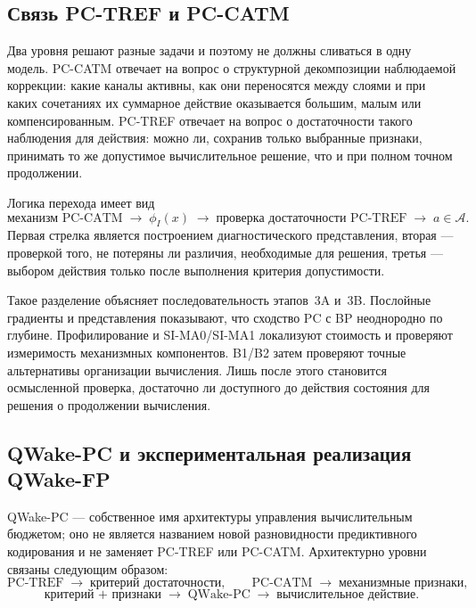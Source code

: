 \subsection{Связь PC-TREF и PC-CATM}
\label{sec:theory-tref-catm-link}

Два уровня решают разные задачи и поэтому не должны сливаться в одну модель.
PC-CATM отвечает на вопрос о структурной декомпозиции наблюдаемой коррекции:
какие каналы активны, как они переносятся между слоями и при каких сочетаниях их суммарное
действие оказывается большим, малым или компенсированным. PC-TREF отвечает на
вопрос о достаточности такого наблюдения для действия: можно ли, сохранив
только выбранные признаки, принимать то же допустимое вычислительное решение,
что и при полном точном продолжении.

Логика перехода имеет вид
\[
  \text{механизм PC-CATM}
  \;\longrightarrow\;
  \phi_I(x)
  \;\longrightarrow\;
  \text{проверка достаточности PC-TREF}
  \;\longrightarrow\;
  a\in\mathcal A.
\]
Первая стрелка является построением диагностического представления, вторая ---
проверкой того, не потеряны ли различия, необходимые для решения, третья ---
выбором действия только после выполнения критерия допустимости.

Такое разделение объясняет последовательность этапов~3A и~3B. Послойные
градиенты и представления показывают, что сходство PC с BP неоднородно по
глубине. Профилирование и SI-MA0/SI-MA1 локализуют стоимость и проверяют
измеримость механизмных компонентов. B1/B2 затем проверяют точные альтернативы
организации вычисления. Лишь после этого становится осмысленной проверка,
достаточно ли доступного до действия состояния для решения о продолжении
вычисления.

\subsection{QWake-PC и экспериментальная реализация QWake-FP}
\label{sec:theory-qwake}

QWake-PC --- собственное имя архитектуры управления вычислительным бюджетом;
оно не является названием новой разновидности предиктивного кодирования и не
заменяет PC-TREF или PC-CATM. Архитектурно уровни связаны следующим образом:
\[
  \text{PC-TREF}
  \;\longrightarrow\;
  \text{критерий достаточности},
  \qquad
  \text{PC-CATM}
  \;\longrightarrow\;
  \text{механизмные признаки},
\]
\[
  \text{критерий + признаки}
  \;\longrightarrow\;
  \text{QWake-PC}
  \;\longrightarrow\;
  \text{вычислительное действие}.
\]

